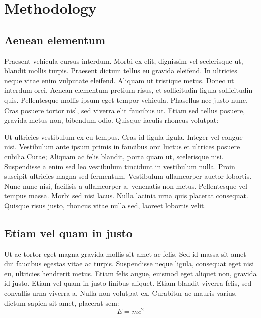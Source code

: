 \documentclass[11pt,oneside,openright]{book}
\begin{document}
\chapter{Methodology}\label{cpt:method}

\section{Aenean elementum}

Praesent vehicula cursus interdum. Morbi ex elit, dignissim vel scelerisque ut, blandit mollis turpis. Praesent dictum tellus eu gravida eleifend. In ultricies neque vitae enim vulputate eleifend. Aliquam ut tristique metus. Donec ut interdum orci. Aenean elementum pretium risus, et sollicitudin ligula sollicitudin quis. Pellentesque mollis ipsum eget tempor vehicula. Phasellus nec justo nunc. Cras posuere tortor nisl, sed viverra elit faucibus ut. Etiam sed tellus posuere, gravida metus non, bibendum odio. Quisque iaculis rhoncus volutpat:

Ut ultricies vestibulum ex eu tempus. Cras id ligula ligula. Integer vel congue nisi. Vestibulum ante ipsum primis in faucibus orci luctus et ultrices posuere cubilia Curae; Aliquam ac felis blandit, porta quam ut, scelerisque nisi. Suspendisse a enim sed leo vestibulum tincidunt in vestibulum nulla. Proin suscipit ultricies magna sed fermentum. Vestibulum ullamcorper auctor lobortis. Nunc nunc nisi, facilisis a ullamcorper a, venenatis non metus. Pellentesque vel tempus massa. Morbi sed nisi lacus. Nulla lacinia urna quis placerat consequat. Quisque risus justo, rhoncus vitae nulla sed, laoreet lobortis velit.

\section{Etiam vel quam in justo}

Ut ac tortor eget magna gravida mollis sit amet ac felis. Sed id massa sit amet dui faucibus egestas vitae ac turpis. Suspendisse neque ligula, consequat eget nisi eu, ultricies hendrerit metus. Etiam felis augue, euismod eget aliquet non, gravida id justo. Etiam vel quam in justo finibus aliquet. Etiam blandit viverra felis, sed convallis urna viverra a. Nulla non volutpat ex. Curabitur ac mauris varius, dictum sapien sit amet, placerat sem:
\begin{equation}
E=mc^2
\end{equation}
\end{document}
